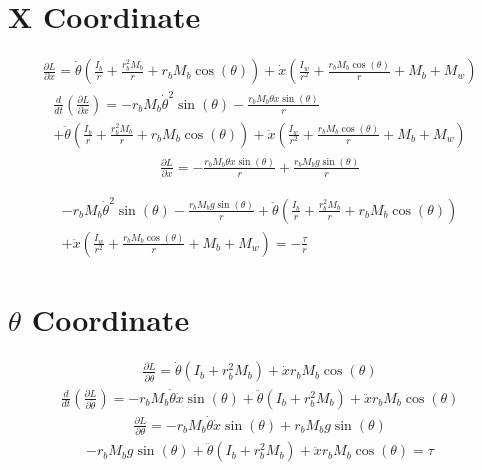 \documentclass[12pt]{article}
\begin{document}
\section*{X Coordinate}
\begin{multline*}
\frac{\partial L}{\partial \dot{x}}= \dot{\theta} \left(\frac{I_{b}}{r} + \frac{r_{b}^{2} M_{b}}{r} + r_{b} M_{b} \cos{\left(\theta \right)}\right) + \dot{x} \left(\frac{I_{w}}{r^{2}} + \frac{r_{b} M_{b} \cos{\left(\theta \right)}}{r} + M_{b} + M_{w}\right)
\end{multline*}
\begin{multline*}
\frac{d}{dt}(\frac{\partial L}{\partial \dot{x}})= - r_{b} M_{b} \dot{\theta}^{2} \sin{\left(\theta \right)} - \frac{r_{b} M_{b} \dot{\theta} \dot{x} \sin{\left(\theta \right)}}{r} \\
+ \ddot{\theta} \left(\frac{I_{b}}{r} + \frac{r_{b}^{2} M_{b}}{r} + r_{b} M_{b} \cos{\left(\theta \right)}\right) + \ddot{x} \left(\frac{I_{w}}{r^{2}} + \frac{r_{b} M_{b} \cos{\left(\theta \right)}}{r} + M_{b} + M_{w}\right)
\end{multline*}
\begin{multline*}
\frac{\partial L}{\partial x}= - \frac{r_{b} M_{b} \dot{\theta} \dot{x} \sin{\left(\theta \right)}}{r} + \frac{r_{b} M_{b} g \sin{\left(\theta \right)}}{r}
\end{multline*}

\begin{multline*}
- r_{b} M_{b} \dot{\theta}^{2} \sin{\left(\theta \right)} - \frac{r_{b} M_{b} g \sin{\left(\theta \right)}}{r} + \ddot{\theta} \left(\frac{I_{b}}{r} + \frac{r_{b}^{2} M_{b}}{r} + r_{b} M_{b} \cos{\left(\theta \right)}\right)\\
+ \ddot{x} \left(\frac{I_{w}}{r^{2}} + \frac{r_{b} M_{b} \cos{\left(\theta \right)}}{r} + M_{b} + M_{w}\right)=-\frac{\tau}{r}
\end{multline*}

\section*{$\theta$ Coordinate}
\begin{multline*}
\frac{\partial L}{\partial \dot{\theta}}= \dot{\theta} \left(I_{b} + r_{b}^{2} M_{b}\right) + \dot{x} r_{b} M_{b} \cos{\left(\theta \right)}
\end{multline*}
\begin{multline*}
\frac{d}{dt}(\frac{\partial L}{\partial \dot{\theta}})= - r_{b} M_{b} \dot{\theta} \dot{x} \sin{\left(\theta \right)} + \ddot{\theta} \left(I_{b} + r_{b}^{2} M_{b}\right) + \ddot{x} r_{b} M_{b} \cos{\left(\theta \right)}
\end{multline*}
\begin{multline*}
\frac{\partial L}{\partial \theta}= - r_{b} M_{b} \dot{\theta} \dot{x} \sin{\left(\theta \right)} + r_{b} M_{b} g \sin{\left(\theta \right)}
\end{multline*}
\begin{multline*}
- r_{b} M_{b} g \sin{\left(\theta \right)} + \ddot{\theta} \left(I_{b} + r_{b}^{2} M_{b}\right) + \ddot{x}r_{b} M_{b} \cos{\left(\theta \right)}=\tau
\end{multline*}
\end{document}
